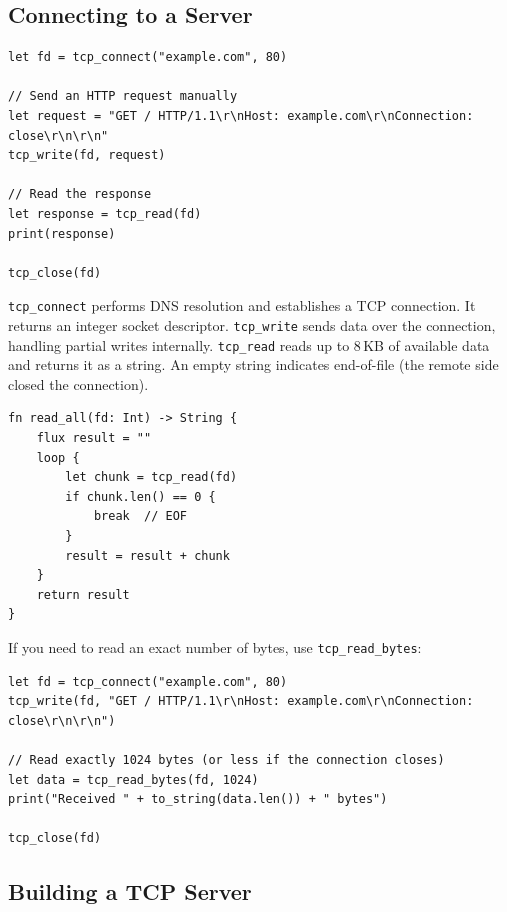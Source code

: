 \subsection{Connecting to a Server}\label{sec:tcp-connect}

\begin{lstlisting}[language=Lattice, caption={Connecting to a TCP server}]
let fd = tcp_connect("example.com", 80)

// Send an HTTP request manually
let request = "GET / HTTP/1.1\r\nHost: example.com\r\nConnection: close\r\n\r\n"
tcp_write(fd, request)

// Read the response
let response = tcp_read(fd)
print(response)

tcp_close(fd)
\end{lstlisting}

\lstinline|tcp_connect| performs DNS resolution and establishes a TCP
connection. It returns an integer socket descriptor. \lstinline|tcp_write|
sends data over the connection, handling partial writes internally.
\lstinline|tcp_read| reads up to 8\,KB of available data and returns it as a
string. An empty string indicates end-of-file (the remote side closed the
connection).

\begin{lstlisting}[language=Lattice, caption={Reading all data from a TCP connection}]
fn read_all(fd: Int) -> String {
    flux result = ""
    loop {
        let chunk = tcp_read(fd)
        if chunk.len() == 0 {
            break  // EOF
        }
        result = result + chunk
    }
    return result
}
\end{lstlisting}

If you need to read an exact number of bytes, use \lstinline|tcp_read_bytes|:

\begin{lstlisting}[language=Lattice, caption={Reading an exact number of bytes}]
let fd = tcp_connect("example.com", 80)
tcp_write(fd, "GET / HTTP/1.1\r\nHost: example.com\r\nConnection: close\r\n\r\n")

// Read exactly 1024 bytes (or less if the connection closes)
let data = tcp_read_bytes(fd, 1024)
print("Received " + to_string(data.len()) + " bytes")

tcp_close(fd)
\end{lstlisting}

\subsection{Building a TCP Server}\label{sec:tcp-server}


